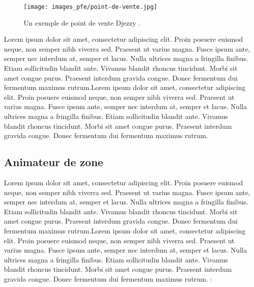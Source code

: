 \medskip

\begin{figure}[hbt!]
  \centering
  \texttt{[image: images\_pfe/point-de-vente.jpg]}
  \caption{Un exemple de point de vente Djezzy \parencite{web_image_point_de_vente_2019}.}
  \label{fig:point-de-vente}
\end{figure}
\FloatBarrier

Lorem ipsum dolor sit amet, consectetur adipiscing elit. Proin posuere euismod neque, non semper nibh viverra sed. Praesent ut varius magna. Fusce ipsum ante, semper nec interdum at, semper et lacus. Nulla ultrices magna a fringilla finibus. Etiam sollicitudin blandit ante. Vivamus blandit rhoncus tincidunt. Morbi sit amet congue purus. Praesent interdum gravida congue. Donec fermentum dui fermentum maximus rutrum.Lorem ipsum dolor sit amet, consectetur adipiscing elit. Proin posuere euismod neque, non semper nibh viverra sed. Praesent ut varius magna. Fusce ipsum ante, semper nec interdum at, semper et lacus. Nulla ultrices magna a fringilla finibus. Etiam sollicitudin blandit ante. Vivamus blandit rhoncus tincidunt. Morbi sit amet congue purus. Praesent interdum gravida congue. Donec fermentum dui fermentum maximus rutrum.

\subsection{Animateur de zone}

Lorem ipsum dolor sit amet, consectetur adipiscing elit. Proin posuere euismod neque, non semper nibh viverra sed. Praesent ut varius magna. Fusce ipsum ante, semper nec interdum at, semper et lacus. Nulla ultrices magna a fringilla finibus. Etiam sollicitudin blandit ante. Vivamus blandit rhoncus tincidunt. Morbi sit amet congue purus. Praesent interdum gravida congue. Donec fermentum dui fermentum maximus rutrum.Lorem ipsum dolor sit amet, consectetur adipiscing elit. Proin posuere euismod neque, non semper nibh viverra sed. Praesent ut varius magna. Fusce ipsum ante, semper nec interdum at, semper et lacus. Nulla ultrices magna a fringilla finibus. Etiam sollicitudin blandit ante. Vivamus blandit rhoncus tincidunt. Morbi sit amet congue purus. Praesent interdum gravida congue. Donec fermentum dui fermentum maximus rutrum. :

\medskip

